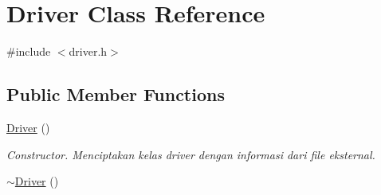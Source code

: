 \hypertarget{classDriver}{}\section{Driver Class Reference}
\label{classDriver}


{\ttfamily \#include $<$driver.\+h$>$}

\subsection*{Public Member Functions}
\begin{DoxyCompactItemize}
\item 
\hyperlink{classDriver_af0658d103e3e810a8e9ef0a53bb2e261}{Driver} ()\hypertarget{classDriver_af0658d103e3e810a8e9ef0a53bb2e261}{}\label{classDriver_af0658d103e3e810a8e9ef0a53bb2e261}

\begin{DoxyCompactList}\small\item\em Constructor. Menciptakan kelas driver dengan informasi dari file eksternal. \end{DoxyCompactList}\item 
\hyperlink{classDriver_ac7645eea8d3ce2bc39ddbda5e840297a}{$\sim$\+Driver} ()\hypertarget{classDriver_ac7645eea8d3ce2bc39ddbda5e840297a}{}\label{classDriver_ac7645eea8d3ce2bc39ddbda5e840297a}


\end{DoxyCompactItemize}
